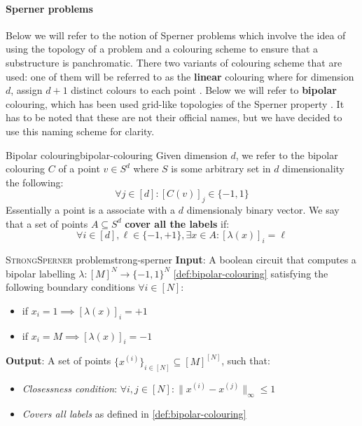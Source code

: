 \paragraph{Sperner problems}

Below we will refer to the notion of Sperner problems which involve
the idea of using the topology of a problem and a colouring scheme to ensure
that a substructure is panchromatic. There two variants of colouring scheme
that are used: one of them will be referred to as the \textbf{linear} colouring
where for dimension $d$, assign $d+1$ distinct colours to each point \cite{daskalakis_ComplexityComputingNash_2006, chen_Complexity2DDiscrete_2009}.
Below we will refer to \textbf{bipolar} colouring, which has been used grid-like topologies of the Sperner property
\cite{chen_SettlingComplexityComputing_2009, deligkas_PureCircuitTightInapproximability_2024, daskalakis_ComplexityConstrainedMinmax_2021}.
It has to be noted that these are not their official names, but we have decided
to use this naming scheme for clarity.



\begin{definitionbox}{Bipolar colouring}{bipolar-colouring}
    Given dimension $d$, we refer to the bipolar colouring $C$ of a point $v \in S^d$
    where $S$ is some arbitrary set in $d$ dimensionality the following:
    $$
    \forall j \in [d]: [C(v)]_j \in \{-1,1\}
    $$
    Essentially a point is a associate with a $d$ dimensionaly binary vector.
    We say that a set of points $A \subseteq S^d$ \textbf{cover all the labels} if:
    $$
        \forall i \in [d], \ell \in \{-1, +1\}, \exists x \in A: [\lambda(x)]_{i} = \ell
    $$
\end{definitionbox}



\begin{definitionbox}{\textsc{StrongSperner} problem}{strong-sperner}
    \textbf{Input}: A boolean circuit that computes a bipolar labelling $\lambda: [M]^N \to \{-1, 1\}^N$ \ref{def:bipolar-colouring}
    satisfying the following boundary conditions $\forall i \in [N]$:
    \begin{itemize}
        \item if $x_i = 1 \implies [\lambda(x)]_i = +1$
        \item if $x_i = M \implies [\lambda(x)]_i = -1$
    \end{itemize}
    \textbf{Output}: A set of points $\{x^{(i)}\}_{i \in [N]} \subseteq [M]^{[N]}$, such that:
    \begin{itemize}
        \item \textit{Closessness condition}: $\forall i,j \in [N]: \|x^{(i)} - x^{(j)}\|_{\infty} \leq 1$
        \item \textit{Covers all labels} as defined in \ref{def:bipolar-colouring}
    \end{itemize}
\end{definitionbox}

